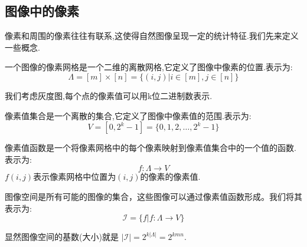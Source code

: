 \subsection{图像中的像素}
像素和周围的像素往往有联系,这使得自然图像呈现一定的统计特征.我们先来定义一些概念.
\begin{definition}[像素网格]
    一个图像的像素网格是一个二维的离散网格,它定义了图像中像素的位置.表示为:
    \begin{equation}
        \Lambda = [m] \times [n] = \{(i, j) | i \in [m], j \in [n]\}
    \end{equation}
\end{definition}
我们考虑灰度图,每个点的像素值可以用k位二进制数表示.
\begin{definition}[像素值集合]
    像素值集合是一个离散的集合,它定义了图像中像素值的范围.表示为:
    \begin{equation}
        V = [0, 2^k - 1] = \{0, 1, 2, \ldots, 2^k - 1\}
    \end{equation}
\end{definition}
\begin{definition}[像素值函数]
    像素值函数是一个将像素网格中的每个像素映射到像素值集合中的一个值的函数.表示为:
    \begin{equation}
        f: \Lambda \to V
    \end{equation}
    $f(i, j)$表示像素网格中位置为$(i, j)$的像素的像素值.
\end{definition}
\begin{definition}[图像空间]
    图像空间是所有可能的图像的集合，这些图像可以通过像素值函数形成。我们将其表示为:
    \begin{equation}
        \mathcal{I} = \{f | f: \Lambda \to V\}
    \end{equation}
\end{definition}
显然图像空间的基数(大小)就是 $|\mathcal{I}| = 2^{k|\Lambda|} = 2^{kmn}$.
